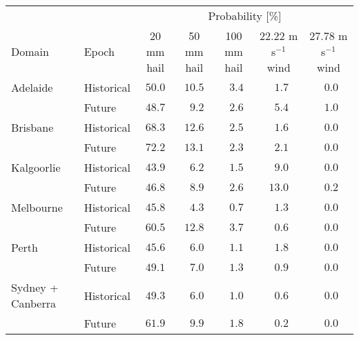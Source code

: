 \begin{tabular}{llccccc}
\hline
& & \multicolumn{5}{c}{Probability [\%]} \\ 
Domain & Epoch & 20 mm hail & 50 mm hail & 100 mm hail & 22.22 m s$^{-1}$ wind & \multicolumn{1}{c}{27.78 m s$^{-1}$ wind} \\ 
\hline
Adelaide & Historical  & $50.0$ & $10.5$ & $\phantom{0}3.4$ & $\phantom{0}1.7$ & $\phantom{0}0.0$ \\
 & Future  & $48.7$ & $\phantom{0}9.2$ & $\phantom{0}2.6$ & $\phantom{0}5.4$ & $\phantom{0}1.0$ \\
Brisbane & Historical  & $68.3$ & $12.6$ & $\phantom{0}2.5$ & $\phantom{0}1.6$ & $\phantom{0}0.0$ \\
 & Future  & $72.2$ & $13.1$ & $\phantom{0}2.3$ & $\phantom{0}2.1$ & $\phantom{0}0.0$ \\
Kalgoorlie & Historical  & $43.9$ & $\phantom{0}6.2$ & $\phantom{0}1.5$ & $\phantom{0}9.0$ & $\phantom{0}0.0$ \\
 & Future  & $46.8$ & $\phantom{0}8.9$ & $\phantom{0}2.6$ & $13.0$ & $\phantom{0}0.2$ \\
Melbourne & Historical  & $45.8$ & $\phantom{0}4.3$ & $\phantom{0}0.7$ & $\phantom{0}1.3$ & $\phantom{0}0.0$ \\
 & Future  & $60.5$ & $12.8$ & $\phantom{0}3.7$ & $\phantom{0}0.6$ & $\phantom{0}0.0$ \\
Perth & Historical  & $45.6$ & $\phantom{0}6.0$ & $\phantom{0}1.1$ & $\phantom{0}1.8$ & $\phantom{0}0.0$ \\
 & Future  & $49.1$ & $\phantom{0}7.0$ & $\phantom{0}1.3$ & $\phantom{0}0.9$ & $\phantom{0}0.0$ \\
Sydney + Canberra & Historical  & $49.3$ & $\phantom{0}6.0$ & $\phantom{0}1.0$ & $\phantom{0}0.6$ & $\phantom{0}0.0$ \\
 & Future  & $61.9$ & $\phantom{0}9.9$ & $\phantom{0}1.8$ & $\phantom{0}0.2$ & $\phantom{0}0.0$ \\
\hline 
\end{tabular}
